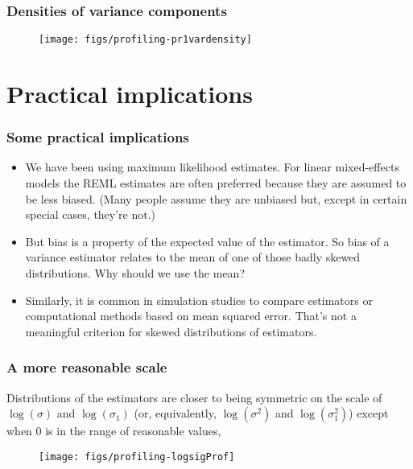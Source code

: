 \documentclass[dvipsnames,pdflatex,beamer]{beamer}
\begin{document}
\begin{frame}[fragile]
  \frametitle{Densities of variance components}
\begin{figure}[tb]
  \centering
\texttt{[image: figs/profiling-pr1vardensity]}
\end{figure}
\end{frame}

\section{Practical implications}

\begin{frame}
  \frametitle{Some practical implications}
  \begin{itemize}
  \item We have been using maximum likelihood estimates.  For linear
    mixed-effects models the REML estimates are often preferred
    because they are assumed to be less biased.  (Many people assume
    they are unbiased but, except in certain special cases, they're not.)
  \item But bias is a property of the expected value of the
    estimator.  So bias of a variance estimator relates to the mean of
    one of those badly skewed distributions.  Why should we use the mean?
  \item Similarly, it is common in simulation studies to compare
    estimators or computational methods based on mean squared error.
    That's not a meaningful criterion for skewed distributions of
    estimators.
  \end{itemize}
\end{frame}

\begin{frame}
  \frametitle{A more reasonable scale} 
  Distributions of the estimators are closer to being symmetric on the
  scale of $\log(\sigma)$ and $\log(\sigma_1)$ (or, equivalently,
  $\log(\sigma^2)$ and $\log(\sigma_1^2)$) except when 0 is in the
  range of reasonable values,
  \begin{figure}[tb]
    \centering
\texttt{[image: figs/profiling-logsigProf]}
  \end{figure}
\end{frame}
\end{document}
